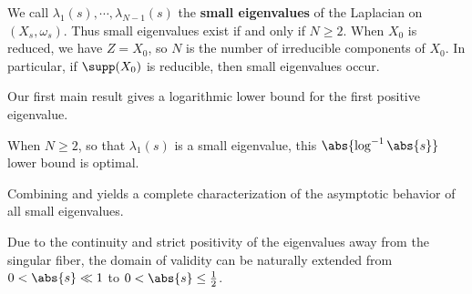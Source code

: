 \documentclass[12pt]{amsart}
\begin{document}
We call $\lambda_1(s), \cdots, \lambda_{N-1}(s)$ the \textbf{small eigenvalues}
of the Laplacian on $(X_s,\omega_s)$. Thus small eigenvalues exist if and only
if $N \ge 2$. When $X_0$ is reduced, we have $Z = X_0$, so $N$ is the number
of irreducible components of $X_0$. In particular, if $\supp(X_0)$ is
reducible, then small eigenvalues occur.

Our first main result gives a logarithmic lower bound for the first positive eigenvalue.


When $N \ge 2$, so that $\lambda_1(s)$ is a small eigenvalue, this
\(\abs{\log^{-1}\abs{s}}\) lower bound is optimal.


Combining  and 
 yields a complete 
characterization of the asymptotic behavior of all {small eigenvalues}.


\begin{remark}
    Due to the continuity and strict positivity of the eigenvalues 
    away from the singular fiber, the domain of validity can be naturally 
    extended from $0 < \abs{s} \ll 1$ to $0 < \abs{s} \leq \frac{1}{2}$.
\end{remark}
\end{document}
